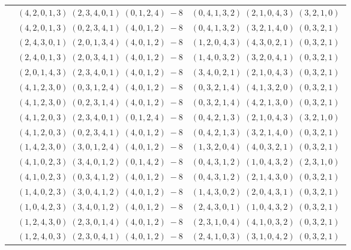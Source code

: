 \documentclass[11pt]{article}
\begin{document}
\begin{longtable}[l]{|c|c|c|}
 \cline{2-3} 
 & $(4 ,2 ,0 ,1 ,3) \;(2 ,3 ,4 ,0 ,1) \;(0 ,1 ,2 ,4) \;-8$ & $(0 ,4 ,1 ,3 ,2) \;(2 ,1 ,0 ,4 ,3) \;(3 ,2 ,1 ,0) \;$\\ 
 \cline{2-3} 
 & $(4 ,2 ,0 ,1 ,3) \;(0 ,2 ,3 ,4 ,1) \;(4 ,0 ,1 ,2) \;-8$ & $(0 ,4 ,1 ,3 ,2) \;(3 ,2 ,1 ,4 ,0) \;(0 ,3 ,2 ,1) \;$\\ 
 \cline{2-3} 
 & $(2 ,4 ,3 ,0 ,1) \;(2 ,0 ,1 ,3 ,4) \;(4 ,0 ,1 ,2) \;-8$ & $(1 ,2 ,0 ,4 ,3) \;(4 ,3 ,0 ,2 ,1) \;(0 ,3 ,2 ,1) \;$\\ 
 \cline{2-3} 
 & $(2 ,4 ,0 ,1 ,3) \;(2 ,0 ,3 ,4 ,1) \;(4 ,0 ,1 ,2) \;-8$ & $(1 ,4 ,0 ,3 ,2) \;(3 ,2 ,0 ,4 ,1) \;(0 ,3 ,2 ,1) \;$\\ 
 \cline{2-3} 
 & $(2 ,0 ,1 ,4 ,3) \;(2 ,3 ,4 ,0 ,1) \;(4 ,0 ,1 ,2) \;-8$ & $(3 ,4 ,0 ,2 ,1) \;(2 ,1 ,0 ,4 ,3) \;(0 ,3 ,2 ,1) \;$\\ 
 \cline{2-3} 
 & $(4 ,1 ,2 ,3 ,0) \;(0 ,3 ,1 ,2 ,4) \;(4 ,0 ,1 ,2) \;-8$ & $(0 ,3 ,2 ,1 ,4) \;(4 ,1 ,3 ,2 ,0) \;(0 ,3 ,2 ,1) \;$\\ 
 \cline{2-3} 
 & $(4 ,1 ,2 ,3 ,0) \;(0 ,2 ,3 ,1 ,4) \;(4 ,0 ,1 ,2) \;-8$ & $(0 ,3 ,2 ,1 ,4) \;(4 ,2 ,1 ,3 ,0) \;(0 ,3 ,2 ,1) \;$\\ 
 \cline{2-3} 
 & $(4 ,1 ,2 ,0 ,3) \;(2 ,3 ,4 ,0 ,1) \;(0 ,1 ,2 ,4) \;-8$ & $(0 ,4 ,2 ,1 ,3) \;(2 ,1 ,0 ,4 ,3) \;(3 ,2 ,1 ,0) \;$\\ 
 \cline{2-3} 
 & $(4 ,1 ,2 ,0 ,3) \;(0 ,2 ,3 ,4 ,1) \;(4 ,0 ,1 ,2) \;-8$ & $(0 ,4 ,2 ,1 ,3) \;(3 ,2 ,1 ,4 ,0) \;(0 ,3 ,2 ,1) \;$\\ 
 \cline{2-3} 
 & $(1 ,4 ,2 ,3 ,0) \;(3 ,0 ,1 ,2 ,4) \;(4 ,0 ,1 ,2) \;-8$ & $(1 ,3 ,2 ,0 ,4) \;(4 ,0 ,3 ,2 ,1) \;(0 ,3 ,2 ,1) \;$\\ 
 \cline{2-3} 
 & $(4 ,1 ,0 ,2 ,3) \;(3 ,4 ,0 ,1 ,2) \;(0 ,1 ,4 ,2) \;-8$ & $(0 ,4 ,3 ,1 ,2) \;(1 ,0 ,4 ,3 ,2) \;(2 ,3 ,1 ,0) \;$\\ 
 \cline{2-3} 
 & $(4 ,1 ,0 ,2 ,3) \;(0 ,3 ,4 ,1 ,2) \;(4 ,0 ,1 ,2) \;-8$ & $(0 ,4 ,3 ,1 ,2) \;(2 ,1 ,4 ,3 ,0) \;(0 ,3 ,2 ,1) \;$\\ 
 \cline{2-3} 
 & $(1 ,4 ,0 ,2 ,3) \;(3 ,0 ,4 ,1 ,2) \;(4 ,0 ,1 ,2) \;-8$ & $(1 ,4 ,3 ,0 ,2) \;(2 ,0 ,4 ,3 ,1) \;(0 ,3 ,2 ,1) \;$\\ 
 \cline{2-3} 
 & $(1 ,0 ,4 ,2 ,3) \;(3 ,4 ,0 ,1 ,2) \;(4 ,0 ,1 ,2) \;-8$ & $(2 ,4 ,3 ,0 ,1) \;(1 ,0 ,4 ,3 ,2) \;(0 ,3 ,2 ,1) \;$\\ 
 \cline{2-3} 
 & $(1 ,2 ,4 ,3 ,0) \;(2 ,3 ,0 ,1 ,4) \;(4 ,0 ,1 ,2) \;-8$ & $(2 ,3 ,1 ,0 ,4) \;(4 ,1 ,0 ,3 ,2) \;(0 ,3 ,2 ,1) \;$\\ 
 \cline{2-3} 
 & $(1 ,2 ,4 ,0 ,3) \;(2 ,3 ,0 ,4 ,1) \;(4 ,0 ,1 ,2) \;-8$ & $(2 ,4 ,1 ,0 ,3) \;(3 ,1 ,0 ,4 ,2) \;(0 ,3 ,2 ,1) \;$\\ 

\end{longtable}
\end{document}
